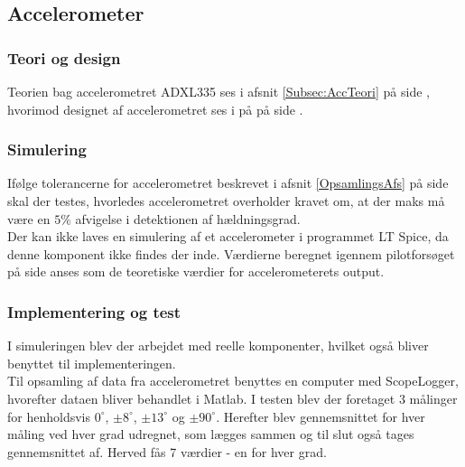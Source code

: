\subsection{Accelerometer}
\subsubsection{Teori og design}
Teorien bag accelerometret ADXL335 ses i afsnit \ref{Subsec:AccTeori} på side \pageref{Subsec:AccTeori}, hvorimod designet af accelerometret ses i på  på side \pageref{pforsoeg1}.

\subsubsection{Simulering}
Ifølge tolerancerne for accelerometret beskrevet i afsnit \ref{OpsamlingsAfs} på side \pageref{OpsamlingsAfs} skal der testes, hvorledes accelerometret overholder kravet om, at der maks må være en $5\%$ afvigelse i detektionen af hældningsgrad. \\
Der kan ikke laves en simulering af et accelerometer i programmet LT Spice, da denne komponent ikke findes der inde. Værdierne beregnet igennem pilotforsøget på side \pageref{Sec:Pilotforsoeg} anses som de teoretiske værdier for accelerometerets output.

\subsubsection{Implementering og test}
I simuleringen blev der arbejdet med reelle komponenter, hvilket også bliver benyttet til implementeringen. \\
Til opsamling af data fra accelerometret benyttes en computer med ScopeLogger, hvorefter dataen bliver behandlet i Matlab. I testen blev der foretaget 3 målinger for henholdsvis $0^\circ$, $\pm8^\circ$, $\pm13^\circ$ og $\pm90^\circ$. Herefter blev gennemsnittet for hver måling ved hver grad udregnet, som lægges sammen og til slut også tages gennemsnittet af. Herved fås 7 værdier - en for hver grad.